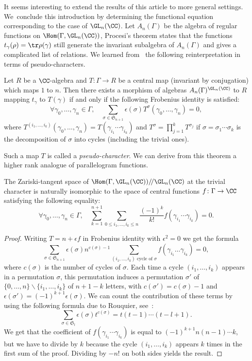 It seems interesting to extend the results of this article to more general
settings. We~conclude this introduction by determining the functional
equation corresponding to the case of
$\GL_n(\CC)$.
Let $A_n(\Gamma)$ be the algebra of regular functions on
$\Hom(\Gamma,\GL_n(\CC))$, Procesi's theorem states that the functions
$t_\gamma(\rho)=\tr \rho(\gamma)$ still generate the invariant subalgebra
of $A_n(\Gamma)$ and gives a complicated list of relations.
We learned from~\cite[Chap.\,2]{ChenevierHab} the following reinterpretation
in terms of pseudo-characters.
\begin{theorem}
Let $R$ be a $\CC$-algebra and $T:\Gamma\to R$ be a central map
(\ie invariant by conjugation) which maps $1$ to $n$.
Then there exists a morphism of algebras
$A_n(\Gamma)^{\GL_n(\CC)}$ to $R$ mapping $t_\gamma$ to $T(\gamma)$
if and only if the following Frobenius identity is satisfied:
\[\forall \gamma_0,\ldots,\gamma_{n}\in \Gamma, \quad
\sum_{\sigma\in \mathfrak{S}_{n+1}}\epsilon(\sigma)T^\sigma
(\gamma_0,\ldots,\gamma_n)=0, \]
where
$T^{(i_1,\ldots,i_k)}(\gamma_0,\ldots,\gamma_n)=
T(\gamma_{i_1}\cdots\gamma_{i_k})$
and $T^{\sigma}=\prod_{j=1}^k T^{\sigma_j}$ if
$\sigma=\sigma_1\cdots\sigma_k$ is the decomposition of $\sigma$ into
cycles (including the trivial ones).
\end{theorem}
Such a map $T$ is called a {\em pseudo-character}. We can derive from this
theorem a higher rank analogue of parallelogram functions.
\begin{corollary}
The Zariski-tangent space of
$\Hom(\Gamma,\GL_n(\CC))/\!/\GL_n(\CC)$ at the trivial character is naturally isomorphic to the space
of central functions $f\colon\Gamma\to\CC$ satisfying the following equality:
\begin{equation}\label{eq:Paraln}
\forall \gamma_0,\ldots,\gamma_n\in \Gamma,
\quad\sum_{k=1}^{n+1}\sum_{0\le i_1,\ldots,
i_k\le n}\frac{(-1)^{k}}{k!}f(\gamma_{i_1}\cdots\gamma_{i_k})=0.
\end{equation}
\end{corollary}
\begin{proof}
Writing $T=n+\epsilon f$ in Frobenius identity with $\epsilon^2=0$ we get
the formula
\[ \sum_{\sigma\in \mathfrak{S}_{n+1}}\epsilon(\sigma)n^{c(\sigma)-1}
\sum_{(i_1,\ldots,i_k)\text{ cycle of }\sigma}f(\gamma_{i_1}\ldots
\gamma_{i_k})=0, \]
where $c(\sigma)$ is the number of cycles of $\sigma$.
Each time a cycle $(i_1,\ldots,i_k)$ appears in a permutation $\sigma$,
this permutation induces a permutation $\sigma'$ of
$\{0,\ldots,n\}\smallsetminus\{i_1,\ldots,i_k\}$ of $n+1-k$ letters,
with $c(\sigma')=c(\sigma)-1$ and
$\epsilon(\sigma')=(-1)^{k+1}\epsilon(\sigma)$.
We can count the contribution of these terms by using the following
formula due to Rouquier, see~\cite[Cor.\,3.2]{Rouquier}:
\[ \sum_{\sigma\in \mathfrak{S}_l}\epsilon(\sigma)t^{c(\sigma)}=t(t-1)
\cdots(t-l+1). \]
We get that the coefficient of $f(\gamma_{i_1}\cdots\gamma_{i_k})$ is
equal to $(-1)^{k+1}n(n-1)\cdots k$, but we have to divide by $k$ because
the cycle $(i_1,\ldots,i_k)$ appears $k$ times in the first sum of the
proof. Dividing by $-n!$ on both sides yields the result.
\end{proof}

